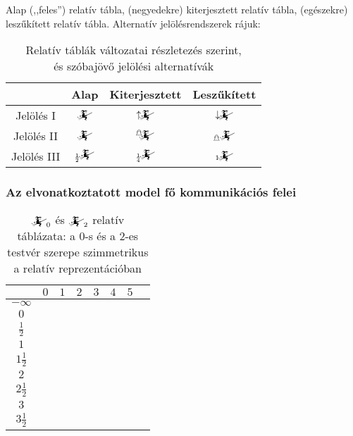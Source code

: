 \documentclass{article}
\newcommand{\blk}{\cellcolor{darkgray}}
\newcommand{\red}{\cellcolor{red!33}}
\newcommand{\grn}{\cellcolor{green!33}}
\newcommand{\nothing}{\text{\raisebox{0.4em}{\rotatebox{180}{$\curvearrowleft$}}}}%
\newcommand{\just}[1]{\boxed{#1}}%
\newcommand{\incl}{\mathbf{incl}}
\newcommand{\excl}{\mathbf{excl}}
\newcommand{\currymainfun}[1]{\mathwitch_{#1}}
\begin{document}
	Alap (,,feles'') relatív tábla, (negyedekre) kiterjesztett relatív tábla, (egészekre) leszűkített relatív tábla. Alternatív jelölésrendszerek rájuk:
	\begin{table}[H]
		\caption*{Relatív táblák változatai részletezés szerint,\\és szóbajövő jelölési alternatívák}
		\centering
		\begin{tabular}{c|ccc}
			             &  Alap                             &  Kiterjesztett                     &  Leszűkített\\\hline\hline
			Jelölés I    &  $\currymainfun{}$                &  $\uparrow\!\!\!\currymainfun{}$       &  $\downarrow\!\!\!\currymainfun{}$\\\hline
			Jelölés II   &  $\currymainfun{}$                &  ${}^{\mathghost}\!\!\!\currymainfun{}$  &  ${}_{\mathghost}\!\currymainfun{}$\\\hline
			Jelölés III  &  ${}_{\frac12}\!\!\currymainfun{}$  &  ${}_{\frac14}\!\!\currymainfun{}$   &  ${}_1\!\!\currymainfun{}$
		\end{tabular}
	\end{table}

	\subsubsection{Az elvonatkoztatott model fő kommunikációs felei}

	\begin{table}[H]
		\caption*{$\currymainfun0$ és $\currymainfun2$ relatív táblázata: a 0-s és a 2-es testvér szerepe szimmetrikus a relatív reprezentációban}
		\centering
		\begin{tabular}{c||c|c|c|c|c|c|c|}
				&	$0$		&	$1$		&	$2$		&	$3$		&	$4$		&	$5$		\\\hline\hline
		$-\infty$	&	\nothing	&	\nothing	&	\nothing	&	\nothing	&	\nothing	&	\nothing	\\\hline
			$0$	&	\nothing	&	\nothing	&	\nothing	&	\nothing	&	\nothing	&	\grn\just\incl	\\\hline
		$\frac12$	&	\red\just\excl	&	\nothing	&	\nothing	&	\nothing	&	\nothing	&	\grn\just\incl	\\\hline
			$1$	&	\red\just\excl	&	\nothing	&	\nothing	&	\nothing	&	\grn\just\incl	&	\blk		\\\hline
		$1\frac12$	&	\blk		&	\red\just\excl	&	\nothing	&	\nothing	&	\grn\just\incl	&	\blk		\\\hline
			$2$	&	\blk		&	\red\just\excl	&	\nothing	&	\grn\just\incl	&	\blk		&	\blk		\\\hline
		$2\frac12$	&	\blk		&	\blk		&	\red\just\excl	&	\grn\just\incl	&	\blk		&	\blk		\\\hline
			$3$	&	\blk		&	\blk		&	\blk		&	\blk		&	\blk		&	\blk		\\\hline
		$3\frac12$	&	\blk		&	\blk		&	\blk		&	\blk		&	\blk		&	\blk		\\\hline
		\end{tabular}
	\end{table}
\end{document}
